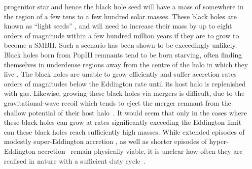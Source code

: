 \documentclass[graphics, twocolumn, usenatbib]{mn2e}
\begin{document}
progenitor star and hence the black hole seed will have a mass of somewhere in the region of a
few tens to a few hundred solar masses. These black holes are known as ``light seeds'' \citep[e.g.][]{Volonteri_2010a}, and will need to increase their mass by up to
eight orders of magnitude within a few hundred million years if they are to grow to become a SMBH. Such
a scenario has been shown to be exceedingly unlikely. Black holes born from PopIII remnants tend to
be born starving, often finding themselves in underdense regions away from the centre of the halo in
which they live \citep{Whalen_2004, Milosavljevic_2009, Alvarez_2009, Smith_2018}. The black holes
are unable to grow efficiently and suffer accretion rates orders of magnitudes below the Eddington
rate until its host halo is replenished with gas. 
Likewise, growing these black holes via mergers is difficult, due to the gravitational-wave recoil which tends to eject the merger remnant from the shallow potential of their host halo~\citep{Haiman_2004}.
It would seem that only in the cases where these 
black holes can grow at rates significantly
exceeding the Eddington limit can these black holes reach sufficiently high masses. While extended episodes of modestly 
super-Eddington accretion \citep{Madau_2001, Madau_2014, Alexander_2014,
  Lupi_2016}, as well as shorter episodes of hyper-Eddington accretion~\citep{Inayoshi_2018} remain physically viable, it is unclear how often they are realised in nature with a sufficient duty cycle~\citep{Pacucci_2017}.
\end{document}

